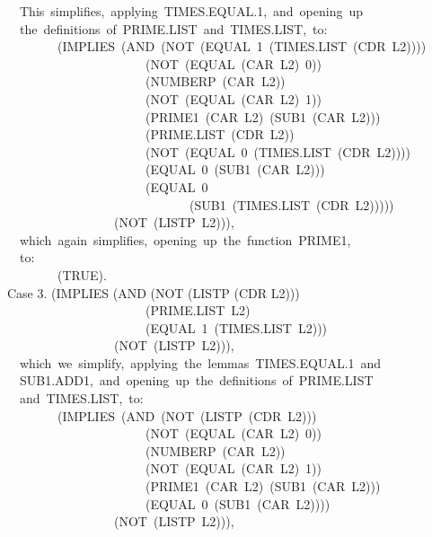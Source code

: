 \documentclass[10pt]{book}
\newenvironment{pubasis}{\begin{flushleft}}{\end{flushleft}}
\begin{document}
\begin{pubasis}
~~This~simplifies,~applying~TIMES.EQUAL.1,~and~opening~up\\
~~the~definitions~of~PRIME.LIST~and~TIMES.LIST,~to:\\

~~~~~~~~(IMPLIES~(AND~(NOT~(EQUAL~1~(TIMES.LIST~(CDR~L2))))\\
~~~~~~~~~~~~~~~~~~~~~~(NOT~(EQUAL~(CAR~L2)~0))\\
~~~~~~~~~~~~~~~~~~~~~~(NUMBERP~(CAR~L2))\\
~~~~~~~~~~~~~~~~~~~~~~(NOT~(EQUAL~(CAR~L2)~1))\\
~~~~~~~~~~~~~~~~~~~~~~(PRIME1~(CAR~L2)~(SUB1~(CAR~L2)))\\
~~~~~~~~~~~~~~~~~~~~~~(PRIME.LIST~(CDR~L2))\\
~~~~~~~~~~~~~~~~~~~~~~(NOT~(EQUAL~0~(TIMES.LIST~(CDR~L2))))\\
~~~~~~~~~~~~~~~~~~~~~~(EQUAL~0~(SUB1~(CAR~L2)))\\
~~~~~~~~~~~~~~~~~~~~~~(EQUAL~0\\
~~~~~~~~~~~~~~~~~~~~~~~~~~~~~(SUB1~(TIMES.LIST~(CDR~L2)))))\\
~~~~~~~~~~~~~~~~~(NOT~(LISTP~L2))),\\

~~which~again~simplifies,~opening~up~the~function~PRIME1,\\
~~to:\\

~~~~~~~~(TRUE).\\

Case 3.	(IMPLIES (AND (NOT (LISTP (CDR L2)))\\
~~~~~~~~~~~~~~~~~~~~~~(PRIME.LIST~L2)\\
~~~~~~~~~~~~~~~~~~~~~~(EQUAL~1~(TIMES.LIST~L2)))\\
~~~~~~~~~~~~~~~~~(NOT~(LISTP~L2))),\\

~~which~we~simplify,~applying~the~lemmas~TIMES.EQUAL.1~and\\
~~SUB1.ADD1,~and~opening~up~the~definitions~of~PRIME.LIST\\
~~and~TIMES.LIST,~to:\\

~~~~~~~~(IMPLIES~(AND~(NOT~(LISTP~(CDR~L2)))\\
~~~~~~~~~~~~~~~~~~~~~~(NOT~(EQUAL~(CAR~L2)~0))\\
~~~~~~~~~~~~~~~~~~~~~~(NUMBERP~(CAR~L2))\\
~~~~~~~~~~~~~~~~~~~~~~(NOT~(EQUAL~(CAR~L2)~1))\\
~~~~~~~~~~~~~~~~~~~~~~(PRIME1~(CAR~L2)~(SUB1~(CAR~L2)))\\
~~~~~~~~~~~~~~~~~~~~~~(EQUAL~0~(SUB1~(CAR~L2))))\\
~~~~~~~~~~~~~~~~~(NOT~(LISTP~L2))),\\


\end{pubasis}
\end{document}
